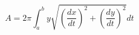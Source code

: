 \documentclass{article}
\begin{document}
\noindent
\begin{equation*}
	A = 2\pi \int_{a}^{b} y\sqrt{(\frac{dx}{dt})^2+(\frac{dy}{dt})^2}dt
\end{equation*}
\end{document}
